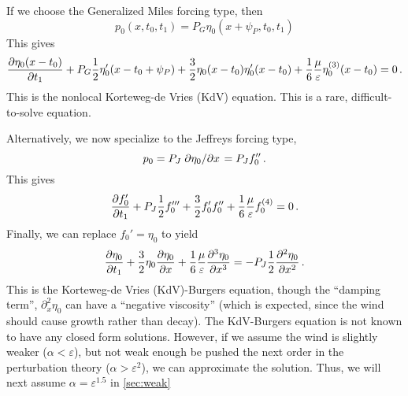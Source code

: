 \documentclass{jfm}
\renewcommand*{\epsilon}{\varepsilon}
\begin{document}
If we choose the Generalized Miles forcing type, then
\[
  p_0(x,t_0,t_1) = P_G \eta_0(x+\psi_P,t_0,t_1)
\]
This gives
\begin{equation}
  \pdv{\eta_0(x-t_0)}{t_1} + P_G \frac{1}{2} \eta_0'(x-t_0+\psi_P) +
  \frac{3}{2} \eta_0(x-t_0) \eta_0'(x-t_0) + \frac{1}{6}
  \frac{\mu}{\epsilon} \eta_0^{(3)}(x-t_0) = 0 \,.
  \label{eq:kdv_burgers_gen}
\end{equation}
This is the nonlocal Korteweg-de Vries (KdV) equation.
This is a rare, difficult-to-solve equation.

Alternatively, we now specialize to the Jeffreys forcing type,
\begin{equation}
  p_0 = P_J \pdv*{\eta_0}{x} = P_J f_0'' \,.
\end{equation}
This gives
\begin{equation}
   \pdv{f_0'}{t_1} + P_J \frac{1}{2} f_0''' + \frac{3}{2} f_0' f_0'' +
   \frac{1}{6} \frac{\mu}{\epsilon} f_0^{(4)} = 0 \,.
\end{equation}
Finally, we can replace $f_0' = \eta_0$ to yield
\begin{equation}
  \pdv{\eta_0}{t_1} + \frac{3}{2}
    \eta_0 \pdv{\eta_0}{x} + \frac{1}{6} \frac{\mu}{\epsilon}
    \pdv[3]{\eta_0}{x} = -P_J \frac{1}{2} \pdv[2]{\eta_0}{x} \,.
  \label{eq:kdv_burgers}
\end{equation}
This is the Korteweg-de Vries (KdV)-Burgers equation, though the
``damping term'', $\partial^2_x \eta_0$ can have a ``negative
viscosity'' (which is expected, since the wind should cause growth
rather than decay).
The KdV-Burgers equation is not known to have any closed form solutions.
However, if we assume the wind is slightly weaker ($\alpha < \epsilon$),
but not weak enough be pushed the next order in the perturbation theory
($\alpha > \epsilon^2$), we can approximate the solution.
Thus, we will next assume $\alpha = \epsilon^{1.5}$ in \cref{sec:weak}
\end{document}
